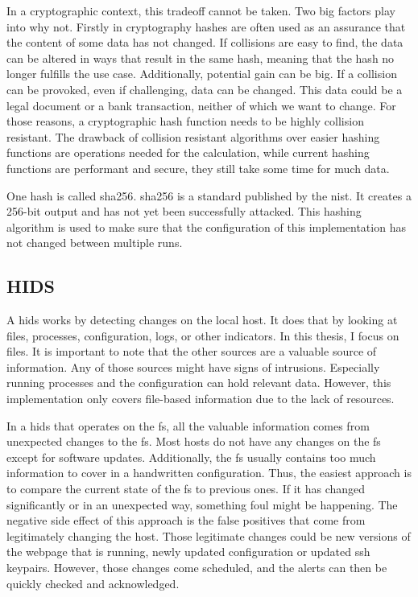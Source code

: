 In a cryptographic context, this tradeoff cannot be taken. Two big factors play into why not. Firstly in cryptography hashes are often used as an assurance that the content of some data has not changed. If collisions are easy to find, the data can be altered in ways that result in the same hash, meaning that the hash no longer fulfills the use case. Additionally, potential gain can be big. If a collision can be provoked, even if challenging, data can be changed. This data could be a legal document or a bank transaction, neither of which we want to change. For those reasons, a cryptographic hash function needs to be highly collision resistant. The drawback of collision resistant algorithms over easier hashing functions are operations needed for the calculation, while current hashing functions are performant and secure, they still take some time for much data. \cite{crypto}

One \gls{hash} is called \gls{sha256}. \gls{sha256} is a standard published by the \gls{nist}. It creates a 256-bit output and has not yet been successfully attacked. \cite{sha} This hashing algorithm is used to make sure that the configuration of this implementation has not changed between multiple runs.


\subsection{HIDS}
\label{sec:def:hids}

A \gls{hids} works by detecting changes on the local host. It does that by looking at files, processes, configuration, logs, or other indicators. In this thesis, I focus on files. It is important to note that the other sources are a valuable source of information. Any of those sources might have signs of intrusions. Especially running processes and the configuration can hold relevant data. However, this implementation only covers file-based information due to the lack of resources.

In a \gls{hids} that operates on the \gls{fs}, all the valuable information comes from unexpected changes to the \gls{fs}. Most hosts do not have any changes on the \gls{fs} except for software updates. Additionally, the \gls{fs} usually contains too much information to cover in a handwritten configuration. Thus, the easiest approach is to compare the current state of the \gls{fs} to previous ones. If it has changed significantly or in an unexpected way, something foul might be happening. The negative side effect of this approach is the false positives that come from legitimately changing the host. Those legitimate changes could be new versions of the webpage that is running, newly updated configuration or updated ssh keypairs. However, those changes come scheduled, and the alerts can then be quickly checked and acknowledged.

